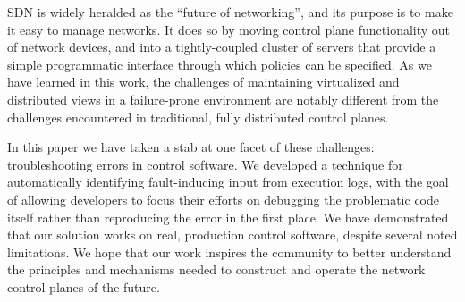 
SDN is widely heralded as the ``future of networking'', and its purpose is to make
it easy to manage networks. It does so by moving control plane functionality out of
network devices, and into a tightly-coupled cluster of servers that provide a simple
programmatic interface through which policies can be specified. As we have
learned in this work, the challenges of maintaining virtualized and distributed
views in a failure-prone environment are
notably different from the challenges encountered in traditional,
fully distributed control planes.

In this paper we have taken a stab at one facet of these challenges:
troubleshooting errors in control software. We developed a technique for automatically
identifying fault-inducing input from execution logs, with the
goal of allowing developers to focus their efforts on debugging the problematic
code itself rather than reproducing the error in the first place. We have
demonstrated that our solution works on real, production control software,
despite several noted limitations. We hope that our work inspires the community to
better understand the principles and mechanisms needed to construct and
operate the network control planes of the future.

